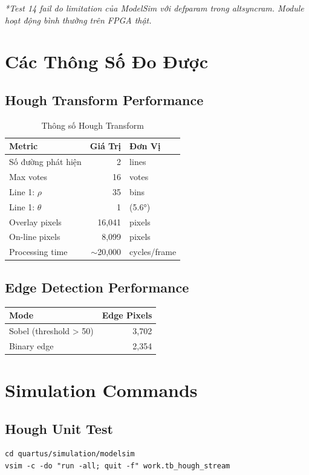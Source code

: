 \documentclass[12pt,a4paper]{article}
\begin{document}
\textit{*Test 14 fail do limitation của ModelSim với defparam trong altsyncram. Module hoạt động bình thường trên FPGA thật.}

\section{Các Thông Số Đo Được}

\subsection{Hough Transform Performance}
\begin{table}[h]
\centering
\begin{tabular}{|l|r|l|}
\hline
\textbf{Metric} & \textbf{Giá Trị} & \textbf{Đơn Vị} \\
\hline
Số đường phát hiện & 2 & lines \\
Max votes & 16 & votes \\
Line 1: $\rho$ & 35 & bins \\
Line 1: $\theta$ & 1 & (5.6°) \\
Overlay pixels & 16,041 & pixels \\
On-line pixels & 8,099 & pixels \\
Processing time & $\sim$20,000 & cycles/frame \\
\hline
\end{tabular}
\caption{Thông số Hough Transform}
\end{table}

\subsection{Edge Detection Performance}
\begin{table}[h]
\centering
\begin{tabular}{|l|r|}
\hline
\textbf{Mode} & \textbf{Edge Pixels} \\
\hline
Sobel (threshold > 50) & 3,702 \\
Binary edge & 2,354 \\
\hline
\end{tabular}
\end{table}

\section{Simulation Commands}

\subsection{Hough Unit Test}
\begin{verbatim}
cd quartus/simulation/modelsim
vsim -c -do "run -all; quit -f" work.tb_hough_stream
\end{verbatim}
\end{document}

